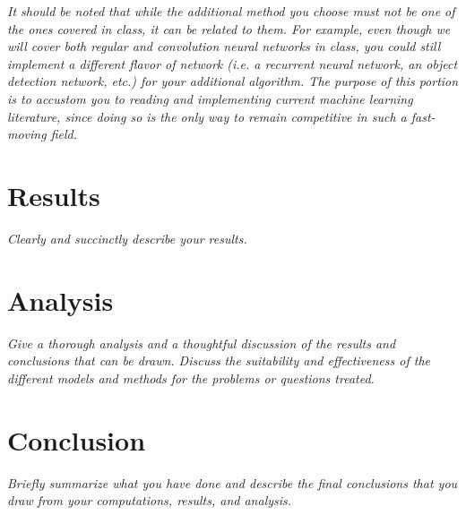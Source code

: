 \documentclass[10pt,letterpaper]{article}
\begin{document}
\textit{It should be noted that while the additional method you choose must not be one of the ones covered in class, it can be related to them. For example, even though we will cover both regular and convolution neural networks in class, you could still implement a different flavor of network (i.e. a recurrent neural network, an object detection network, etc.) for your additional algorithm. The purpose of this portion is to accustom you to reading and implementing current machine learning literature, since doing so is the only way to remain competitive in such a fast-moving field.}

\section{Results}
\textit{Clearly and succinctly describe your results.}

\section{Analysis}
\textit{Give a thorough analysis and a thoughtful discussion of the results and conclusions that can be drawn. Discuss the suitability and effectiveness of the different models and methods for the problems or questions treated.}

\section{Conclusion}
\textit{Briefly summarize what you have done and describe the final conclusions that you draw from your computations, results, and analysis.}
\end{document}
